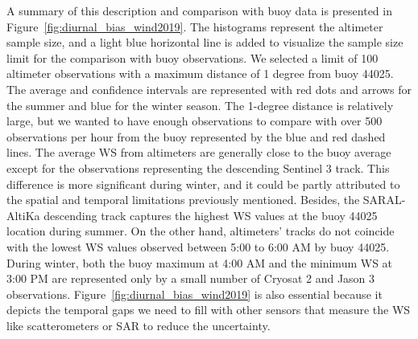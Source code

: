 A summary of this description and comparison with buoy data is presented in Figure~\ref{fig:diurnal_bias_wind2019}. The histograms represent the altimeter sample size, and a light blue horizontal line is added to visualize the sample size limit for the comparison with buoy observations. We selected a limit of 100 altimeter observations with a maximum distance of 1 degree from buoy 44025. The average and confidence intervals are represented with red dots and arrows for the summer and blue for the winter season. The 1-degree distance is relatively large, but we wanted to have enough observations to compare with over 500 observations per hour from the buoy represented by the blue and red dashed lines. The average WS from altimeters are generally close to the buoy average except for the observations representing the descending Sentinel 3 track. This difference is more significant during winter, and it could be partly attributed to the spatial and temporal limitations previously mentioned. Besides, the SARAL-AltiKa descending track captures the highest WS values at the buoy 44025 location during summer. On the other hand, altimeters' tracks do not coincide with the lowest WS values observed between 5:00 to 6:00 AM by buoy 44025. During winter, both the buoy maximum at 4:00 AM and the minimum WS at 3:00 PM are represented only by a small number of Cryosat 2 and Jason 3 observations. Figure~\ref{fig:diurnal_bias_wind2019} is also essential because it depicts the temporal gaps we need to fill with other sensors that measure the WS like scatterometers or SAR to reduce the uncertainty.





\label{Chapter5} %